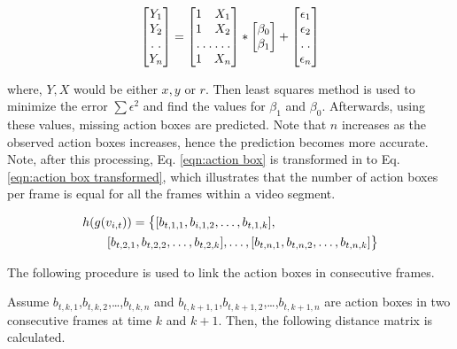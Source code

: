 \begin{equation}
\label{eqn:linear regression}
\begin{bmatrix}
    Y_{1}     \\
    Y_{2}     \\
    \hdotsfor{1} \\
    Y_{n}
\end{bmatrix}
=
\begin{bmatrix}
    1 & X_{1}     \\
    1 & X_{2}     \\
    \hdotsfor{2} \\
    1 & X_{n}
\end{bmatrix}
*
\begin{bmatrix}
    \beta_{0}     \\
    \beta_{1}
\end{bmatrix}
+
\begin{bmatrix}
    \epsilon_{1}     \\
    \epsilon_{2}    \\
    \hdotsfor{1} \\
    \epsilon_{n}
\end{bmatrix}
\end{equation}

where, $Y, X$ would be either $x,y$ or $r$. Then least squares method is used to minimize the error $\sum{\epsilon^2}$ and find the
values for $\beta_{1}$ and $\beta_{0}$. Afterwards, using these values, missing action boxes are predicted.
Note that $n$ increases as the observed action boxes
increases, hence the prediction becomes more accurate. Note, after this processing, Eq. \ref{eqn:action box}
is transformed in to Eq. \ref{eqn:action box transformed},
which illustrates that the number of action boxes per frame is equal for all the frames within a video segment.

\begin{equation}
\label{eqn:action box transformed}
\begin{split}
\MoveEqLeft
 h(g(v_{i,t})) = \big\{[b_{t,1,1},b_{i,1,2},\dots,b_{t,1,k}],\\
 & [b_{t,2,1},b_{t,2,2},\dots,b_{t,2,k}],\dots,[b_{t,n,1},b_{t,n,2},\dots,b_{t,n,k}]\big\}
\end{split}
\end{equation}


The following procedure
is used to link the action boxes in consecutive frames.

Assume $b_{t,k,1}$,$b_{t,k,2}$,\dots,$b_{t,k,n}$ and $b_{t,k+1,1}$,$b_{t,k+1,2}$,\dots,$b_{t,k+1,n}$  are action boxes in two
consecutive frames at time $k$ and $k+1$. Then, the following distance matrix is calculated.



